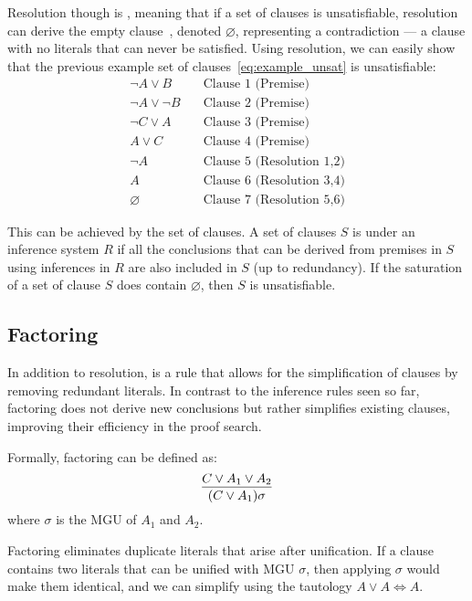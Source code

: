 Resolution though is , meaning that if a set of clauses is unsatisfiable, resolution can derive the empty clause~\cite{robinson1965}, denoted \(\varnothing\), representing a contradiction --- a clause with no literals that can never be satisfied.
Using resolution, we can easily show that the previous example set of clauses~\ref{eq:example_unsat} is unsatisfiable:
\begin{equation}
  \begin{aligned}
    \neg A \lor B &\quad \text{Clause 1 (Premise)} \\
    \neg A \lor \neg B &\quad \text{Clause 2 (Premise)} \\
    \neg C \lor A &\quad \text{Clause 3 (Premise)} \\
    A \lor C &\quad \text{Clause 4 (Premise)} \\
    \neg A &\quad \text{Clause 5 (Resolution 1,2)} \\
    A &\quad \text{Clause 6 (Resolution 3,4)} \\
    \varnothing &\quad \text{Clause 7 (Resolution 5,6)}
  \end{aligned}
\end{equation}

This can be achieved by  the set of clauses. A set of clauses \(S\) is  under an inference system \(R\) if all the conclusions that can be derived from premises in \(S\) using inferences in \(R\) are also included in \(S\) (up to redundancy).
If the saturation of a set of clause \(S\) does contain \(\varnothing\), then \(S\) is unsatisfiable.

\subsection{Factoring}\label{subsec:factoring}

In addition to resolution,  is a rule that allows for the simplification of clauses by removing redundant literals.
In contrast to the inference rules seen so far, factoring does not derive new conclusions but rather simplifies existing clauses, improving their efficiency in the proof search.

Formally, factoring can be defined as:
\begin{equation}
  \infer{(C \lor A_1)\sigma}{C \lor A_1 \lor A_2}
\end{equation}
\indent where \(\sigma\) is the MGU of \(A_1\) and \(A_2\).

\noindent Factoring eliminates duplicate literals that arise after unification. If a clause contains two literals that can be unified with MGU \(\sigma\), then applying \(\sigma\) would make them identical, and we can simplify using the tautology \(A \lor A \iff A\).

